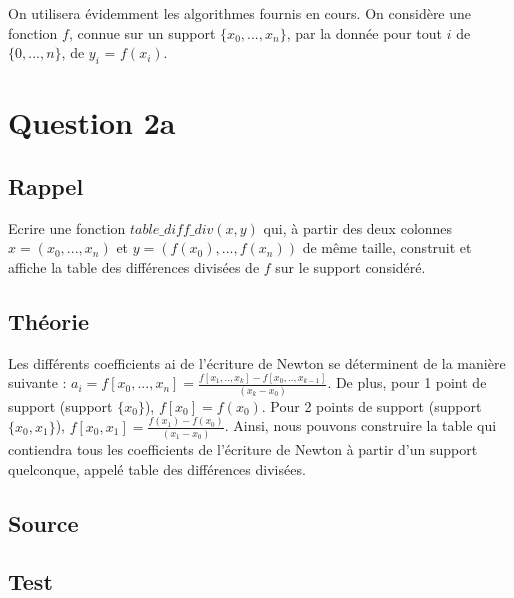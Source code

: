 \documentclass[a4paper,10pt]{report}
\begin{document}
On utilisera évidemment les algorithmes fournis en cours. On considère une
fonction $f$, connue sur un support $\lbrace x_{0},...,x_{n}\rbrace$, par la donnée pour tout $i$ de $\lbrace 0,...,n \rbrace$, de $y_{i}$ = $f(x_{i})$.

\section*{Question 2a}

\subsection*{Rappel}

Ecrire une fonction $table\_diff\_div(x, y)$ qui, à partir des deux colonnes $x = (x_{0},...,x_{n})$ et $y = (f(x_{0}),...,f(x_{n}))$ de même taille, construit et affiche la table des différences divisées de $f$ sur le support considéré.

\subsection*{Théorie}

Les différents coefficients ai de l’écriture de Newton se déterminent de la manière suivante : $a_{i} = f[x_{0},...,x_{n}] = \frac{f[x_{1},..,x_{k}]-f[x_{0},..,x_{k-1}]}{(x_{k}-x_{0})}$.
De plus, pour 1 point de support (support $\lbrace x_{0} \rbrace$), $f[x_{0}] = f(x_{0})$.
Pour 2 points de support (support $\lbrace x_{0},x_{1} \rbrace$), $f[x_{0},x_{1}] = \frac{f(x_{1})-f(x_{0})}{(x_{1}-x_{0})}$.
Ainsi, nous pouvons construire la table qui contiendra tous les coefficients de l’écriture de Newton à partir d’un support quelconque, appelé table des différences divisées.

\newpage
\subsection*{Source}

\begin{center}
	
\end{center}

\subsection*{Test}
\end{document}
